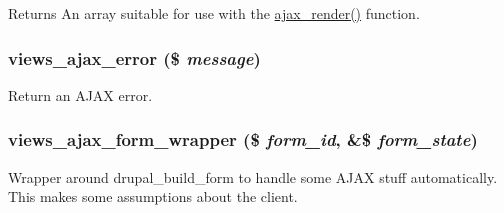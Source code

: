 \begin{DoxyReturn}{Returns}
An array suitable for use with the \hyperlink{group__ajax_ga241c2426bdde049c55b05b7bf5d714a2}{ajax\_\-render()} function. 
\end{DoxyReturn}
\hypertarget{group__ajax_ga59f31023b894be21852b7034f639523f}{
\subsubsection[{views\_\-ajax\_\-error}]{\setlength{\rightskip}{0pt plus 5cm}views\_\-ajax\_\-error (\$ {\em message})}}
\label{group__ajax_ga59f31023b894be21852b7034f639523f}
Return an AJAX error. \hypertarget{group__ajax_ga7eed0d665d7b4c8c8134eb060afbb2be}{
\subsubsection[{views\_\-ajax\_\-form\_\-wrapper}]{\setlength{\rightskip}{0pt plus 5cm}views\_\-ajax\_\-form\_\-wrapper (\$ {\em form\_\-id}, \/  \&\$ {\em form\_\-state})}}
\label{group__ajax_ga7eed0d665d7b4c8c8134eb060afbb2be}
Wrapper around drupal\_\-build\_\-form to handle some AJAX stuff automatically. This makes some assumptions about the client. 